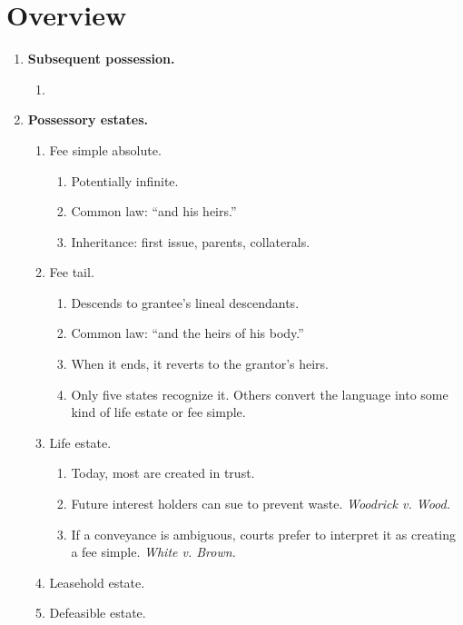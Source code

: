 \section{Overview}

\begin{enumerate}
    \item \textbf{Subsequent possession.}
    \begin{enumerate}
        \item %
    \end{enumerate}
    \item \textbf{Possessory estates.}
    \begin{enumerate}
        \item Fee simple absolute.
        \begin{enumerate}
            \item Potentially infinite.
            \item Common law: ``and his heirs.''
            \item Inheritance: first issue, parents, collaterals.
        \end{enumerate}
        \item Fee tail.
        \begin{enumerate}
            \item Descends to grantee's lineal descendants.
            \item Common law: ``and the heirs of his body.''
            \item When it ends, it reverts to the grantor's heirs.
            \item Only five states recognize it. Others convert the language 
            into some kind of life estate or fee simple.
        \end{enumerate}
        \item Life estate.
        \begin{enumerate}
            \item Today, most are created in trust.
            \item Future interest holders can sue to prevent waste. 
            \emph{Woodrick v. Wood.}
            \item If a conveyance is ambiguous, courts prefer to interpret it 
            as creating a fee simple. \emph{White v. Brown.}
        \end{enumerate}
        \item Leasehold estate.
        \item Defeasible estate.

\end{enumerate}
\end{enumerate}
